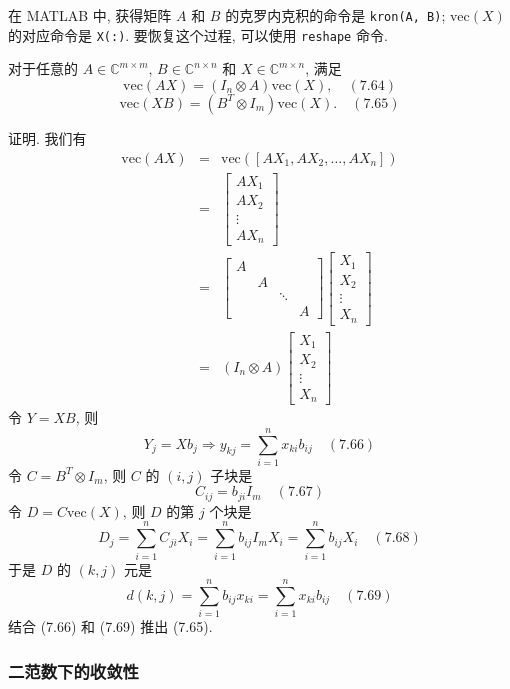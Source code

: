 \documentclass[a4paper]{ctexart}
\newcommand{\hl}[1]
{\noindent {\bf {#1}}}
\begin{document}
在 MATLAB 中, 获得矩阵 $A$ 和 $B$ 的克罗内克积的命令是 \verb|kron(A, B)|; 
$\mathrm{vec}(X)$ 的对应命令是 \verb|X(:)|. 
要恢复这个过程, 可以使用 \verb|reshape| 命令.

\hl{引理 7.47} 对于任意的 $A \in \mathbb{C}^{m \times m}$, 
$B \in \mathbb{C}^{n \times n}$ 和 
$X \in \mathbb{C}^{m \times n}$, 满足
$$
\mathrm{vec}(AX) = (I_n \otimes A)\mathrm{vec}(X), \quad (7.64) 
$$
$$
\mathrm{vec}(XB) = (B^T \otimes I_m)\mathrm{vec}(X). \quad (7.65) 
$$

证明. 我们有
\begin{eqnarray*}
\mathrm{vec}(AX) &=& \mathrm{vec}([AX_1, AX_2, \ldots, AX_n]) \\
&=&
\begin{bmatrix}
AX_1 \\
AX_2 \\
\vdots \\
AX_n
\end{bmatrix} \\
&=&
\begin{bmatrix}
A &&&\\
 & A&&\\
 & & \ddots&\\
 & & & A
\end{bmatrix} 
\begin{bmatrix}
X_1 \\
X_2 \\
\vdots \\
X_n
\end{bmatrix}\\
&=& (I_n \otimes A)
\begin{bmatrix}
X_1 \\
X_2 \\
\vdots \\
X_n
\end{bmatrix}
\end{eqnarray*}
令 $Y = XB$, 则
$$
Y_j = Xb_j \Rightarrow y_{kj} = \sum_{i = 1}^{n} x_{ki}b_{ij} \quad (7.66) 
$$
令 $C = B^T \otimes I_m$, 则 $C$ 的 $(i, j)$ 子块是
$$
 C_{ij} = b_{ji}I_m \quad (7.67) 
$$
令 $D = C\mathrm{vec}(X)$, 则 $D$ 的第 $j$ 个块是
$$
D_j = \sum_{i = 1}^{n} C_{ji}X_i 
= \sum_{i=1}^{n} b_{ij} I_m X_i = \sum_{i=1}^{n} b_{ij}X_i \quad (7.68) 
$$
于是 $D$ 的 $(k, j)$ 元是
$$
d(k,j) = \sum_{i = 1}^{n} b_{ij}x_{ki} 
= \sum_{i=1}^{n} x_{ki}b_{ij} \quad (7.69) 
$$
结合 (7.66) 和 (7.69) 推出 (7.65).

\subsubsection{二范数下的收敛性}
\end{document}
